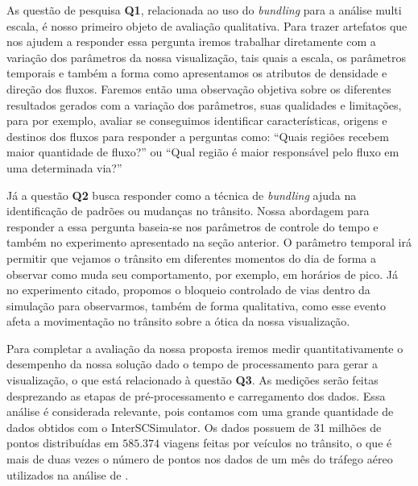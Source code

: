   As questão de pesquisa \textbf{Q1}, relacionada ao uso do \emph{bundling}
para a análise multi escala, é nosso primeiro objeto de avaliação qualitativa.
Para trazer artefatos que nos ajudem a responder essa pergunta iremos trabalhar
diretamente com a variação dos parâmetros da nossa visualização, tais quais a
escala, os parâmetros temporais e também a forma como apresentamos os atributos
de densidade e direção dos fluxos. Faremos então uma observação objetiva sobre
os diferentes resultados gerados com a variação dos parâmetros, suas qualidades
e limitações, para por exemplo, avaliar se conseguimos identificar
características, origens e destinos dos fluxos para responder a perguntas como:
``Quais regiões recebem maior quantidade de fluxo?'' ou ``Qual região é maior
responsável pelo fluxo em uma determinada via?''

  Já a questão \textbf{Q2} busca responder como a técnica de \emph{bundling}
ajuda na identificação de padrões ou mudanças no trânsito. Nossa abordagem para
responder a essa pergunta baseia-se nos parâmetros de controle do tempo e
também no experimento apresentado na seção anterior. O parâmetro temporal irá
permitir que vejamos o trânsito em diferentes momentos do dia de forma a
observar como muda seu comportamento, por exemplo, em horários de pico. Já no
experimento citado, propomos o bloqueio controlado de vias dentro da simulação
para observarmos, também de forma qualitativa, como esse evento afeta a
movimentação no trânsito sobre a ótica da nossa visualização.

  Para completar a avaliação da nossa proposta iremos medir quantitativamente o
desempenho da nossa solução dado o tempo de processamento para gerar a
visualização, o que está relacionado à questão \textbf{Q3}. As medições serão
feitas desprezando as etapas de pré-processamento e carregamento dos dados.
Essa análise é considerada relevante, pois contamos com uma grande quantidade
de dados obtidos com o InterSCSimulator. Os dados possuem de 31 milhões de
pontos distribuídas em $585.374$ viagens feitas por veículos no trânsito, o que
é mais de duas vezes o número de pontos nos dados de um mês do tráfego aéreo
utilizados na análise de \citet{Klein2013}.
